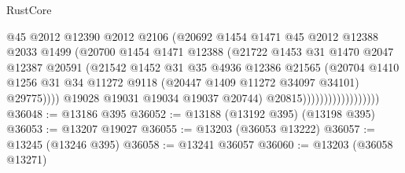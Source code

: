 \begin{lexlean}{RustCore}
\begin{coremodule}
                                        @45
                                        @2012
                                        @12390
                                        @2012
                                        @2106
                                        (@20692
                                          @1454
                                          @1471
                                          @45
                                          @2012
                                          @12388
                                          @2033
                                          @1499
                                          (@20700
                                            @1454
                                            @1471
                                            @12388
                                            (@21722
                                              @1453
                                              @31
                                              @1470
                                              @2047
                                              @12387
                                              @20591
                                              (@21542
                                                @1452
                                                @31
                                                @35
                                                @4936
                                                @12386
                                                @21565
                                                (@20704
                                                  @1410
                                                  @1256
                                                  @31
                                                  @34
                                                  @11272
                                                  @9118
                                                  (@20447 @1409 @11272 @34097 @34101)
                                                  @29775))))
                                          @19028
                                          @19031
                                          @19034
                                          @19037
                                          @20744)
                                        @20815))))))))))))))))))
@36048 := @13186 @395
@36052 := @13188 (@13192 @395) (@13198 @395)
@36053 := @13207 @19027
@36055 := @13203 (@36053 @13222)
@36057 := @13245 (@13246 @395)
@36058 := @13241 @36057
@36060 := @13203 (@36058 @13271)

\end{coremodule}
\end{lexlean}
